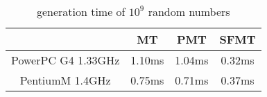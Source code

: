 \documentclass{article}
\begin{document}
\begin{table}[hb]
\begin{center}
\caption{generation time of $10^9$ random numbers\label{speed}}
\begin{tabular}{|c|c|c|c|} \hline
& MT & PMT & SFMT \\ \hline
PowerPC G4 1.33GHz & 1.10ms & 1.04ms & 0.32ms \\ \hline
PentiumM 1.4GHz & 0.75ms & 0.71ms & 0.37ms \\ \hline
\end{tabular}
\end{center}
\end{table}
\end{document}
